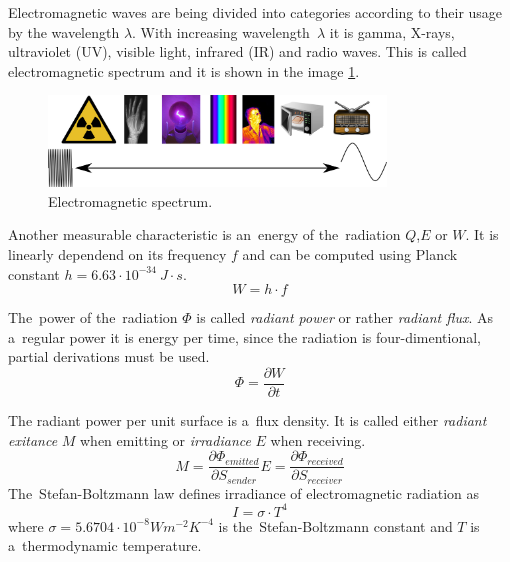 Electromagnetic waves are being divided into categories according to their usage by the wavelength
$\lambda$. With increasing wavelength~$\lambda$ it is gamma, X-rays, ultraviolet (UV), visible light,
infrared (IR) and radio waves. This is called electromagnetic spectrum and it is shown in the image
\ref{fig:spectrum}.

\begin{figure}
\begin{center}
\includegraphics[width=0.8\textwidth]{obrazky-figures/spectrum.png}
\caption{Electromagnetic spectrum.\label{fig:spectrum}}
\end{center}    
\end{figure}

Another measurable characteristic is an~energy of the~radiation $Q$,$E$ or $W$. It is linearly dependend
on its frequency $f$ and can be computed using Planck constant $h=6.63\cdot10^{-34}~J\cdot s $.
\cite{NasaEMSpectrum}
\begin{equation}
W = h\cdot f
\end{equation}

The~power of the~radiation $\Phi$ is called {\it radiant power} or rather {\it radiant flux}. As a~regular
power it is energy per time, since the radiation is four-dimentional, partial derivations must be used.
\begin{equation}
\Phi = \frac{\partial W}{\partial t}
\end{equation}

The radiant power per unit surface is a~flux density. It is called either {\it radiant exitance} $M$
when emitting or {\it irradiance} $E$ when receiving.
\begin{subequations}
\begin{equation}
M = \frac{\partial \Phi_{emitted}}{\partial S_{sender}}
\end{equation}
\begin{equation}
E = \frac{\partial \Phi_{received}}{\partial S_{receiver}}
\end{equation}
\end{subequations}
The~Stefan-Boltzmann law defines irradiance of electromagnetic radiation as
\begin{equation}
I = \sigma \cdot T^4
\end{equation}
where $\sigma = 5.6704\cdot 10^{-8} Wm^{-2}K^{-4}$ is the~Stefan-Boltzmann constant and $T$ is a~thermodynamic
temperature.


